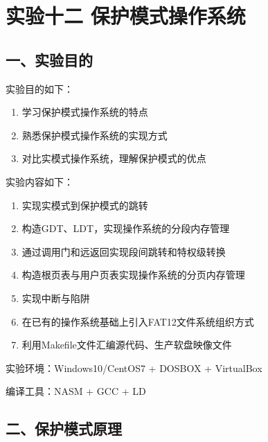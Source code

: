 \documentclass[12pt,a4paper,UTF8]{ctexart}
\begin{document}
\section*{实验十二 \quad 保护模式操作系统}

\subsection*{一、实验目的}

\noindent 实验目的如下：

\renewcommand{\labelenumi}{(\theenumi)}
\begin{enumerate}
\item 学习保护模式操作系统的特点
\item 熟悉保护模式操作系统的实现方式
\item 对比实模式操作系统，理解保护模式的优点
\end{enumerate}

\noindent 实验内容如下：

\begin{enumerate}
\item 实现实模式到保护模式的跳转
\item 构造GDT、LDT，实现操作系统的分段内存管理
\item 通过调用门和远返回实现段间跳转和特权级转换
\item 构造根页表与用户页表实现操作系统的分页内存管理
\item 实现中断与陷阱
\item 在已有的操作系统基础上引入FAT12文件系统组织方式
\item 利用Makefile文件汇编源代码、生产软盘映像文件
\end{enumerate}

\noindent 实验环境：Windows10/CentOS7 + DOSBOX + VirtualBox

\noindent 编译工具：NASM + GCC + LD

\subsection*{二、保护模式原理}
\end{document}
